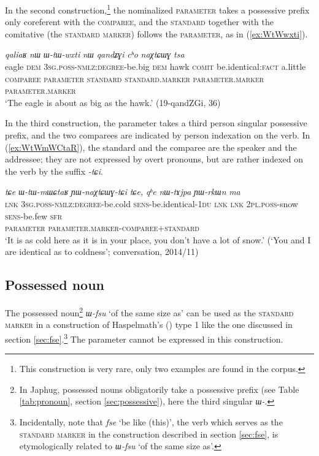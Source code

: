 \documentclass[oneside,a4paper,12pt]{article}
\newcommand{\ipa}[1]{{\phon\textit{#1}}}
\newcommand{\forme}[2]{\ipa{#1} `#2'}
\begin{document}
In the second construction,\footnote{This construction is very rare, only two examples are found in the corpus.} the nominalized \textsc{parameter} takes a possessive prefix only coreferent with the \textsc{comparee}, and the \textsc{standard}  together with the comitative (the \textsc{standard marker}) follows the \textsc{parameter}, as in (\ref{ex:WtWwxti}).

\begin{exe}
\ex \label{ex:WtWwxti}
\glll
\ipa{qaliaʁ} 	\ipa{nɯ} 	\ipa{ɯ-tɯ-wxti} 	\ipa{nɯ} 	\ipa{qandʑɣi} 	\ipa{cʰo} 	\ipa{naχtɕɯɣ} 	\ipa{tsa} 	\\
eagle \textsc{dem} \textsc{3sg.poss-nmlz:degree}-be.big \textsc{dem} hawk \textsc{comit} be.identical:\textsc{fact} a.little  \\
{\textsc{comparee}} { } \textsc{parameter} { } {\textsc{standard}} \textsc{standard.marker} \textsc{parameter.marker}  \textsc{parameter.marker} \\
\glt `The eagle is about as big as the hawk.' (19-qandZGi, 36)
\end{exe}

In the third construction, the parameter takes a third person singular possessive prefix, and the two comparees are indicated by person indexation on the verb. In (\ref{ex:WtWmWCtaR}), the standard and the comparee are the speaker and the addressee; they are not expressed by overt pronouns, but are rather indexed on the verb by the suffix \ipa{-tɕi}.

\begin{exe}
\ex \label{ex:WtWmWCtaR}
\glll
\ipa{tɕe} 	\ipa{ɯ-tɯ-mɯɕtaʁ} 	\ipa{ɲɯ-naχtɕɯɣ-tɕi} 	\ipa{tɕe,} 	\ipa{qʰe} 	\ipa{nɯ-tɤjpa} 	\ipa{ɲɯ-rkɯn} 	\ipa{ma} \\
\textsc{lnk} \textsc{3sg.poss-nmlz:degree}-be.cold \textsc{sens}-be.identical-\textsc{1du} \textsc{lnk} \textsc{lnk} \textsc{2pl.poss}-snow \textsc{sens}-be.few \textsc{sfr} \\
{ } \textsc{parameter} \textsc{parameter.marker-comparee+standard} \\
\glt `It is as cold here as it is in your place, you don't have a lot of snow.' (`You and I are identical as to coldness'; conversation, 2014/11)
\end{exe}



\subsection{Possessed noun} \label{sec:Wfsu}
The possessed noun\footnote{In Japhug, possessed nouns obligatorily take a possessive prefix (see Table \ref{tab:pronoun}, section \ref{sec:possessive}), here the third singular \ipa{ɯ-}. } \forme{ɯ-fsu}{of the same size as} can be used as the \textsc{standard marker} in a construction of Haspelmath's (\citeyear{haspelmath17equative}) type 1 like the one discussed in section \ref{sec:fse}.\footnote{Incidentally, note that \forme{fse}{be like (this)}, the verb which serves as the \textsc{standard marker} in the construction described in section \ref{sec:fse}, is etymologically related to \forme{ɯ-fsu}{of the same size as}.} The parameter cannot be expressed in this construction.
\end{document}
